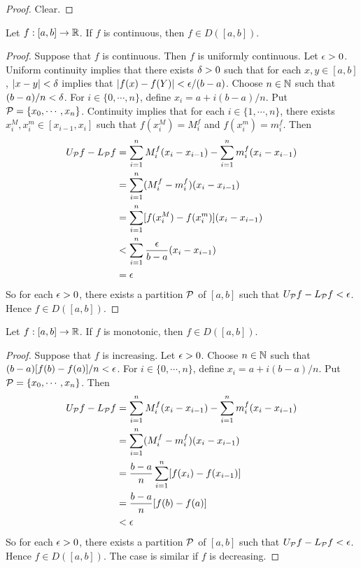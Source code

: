 \documentclass{book}
\begin{document}
	\begin{proof}
		Clear.
	\end{proof}

	\begin{ex}  
		Let $f:[a,b] \rightarrow \mathbb{R}$. If $f$ is continuous, then $f \in D([a,b])$. 
	\end{ex}

	\begin{proof}
		Suppose that $f$ is continuous. Then $f$ is uniformly continuous. Let $\epsilon >0$. Uniform continuity implies that there exists $\delta > 0$ such that for each $x, y \in [a,b]$, $|x-y| < \delta$ implies that $|f(x) - f(Y)| < \epsilon/(b-a)$. Choose $n \in \mathbb{N}$ such that $(b-a)/n < \delta$. For $i \in \{0, \cdots, n\}$, define $x_i = a + i(b-a)/n$. Put $\mathcal{P} = \{x_0, \cdots, x_n\}$. Continuity implies that for each $i \in \{1, \cdots, n\}$, there exists $x_i^M, x_i^m \in [x_{i-1}, x_i]$ such that $f(x_i^M) = M_i^f$ and $f(x_i^m) = m_i^f$. Then 
		\begin{align*}
			U_{\mathcal{P}} f - L_{\mathcal{P}} f 
			&= \sum_{i=1}^n M^f_i(x_i - x_{i-1}) - \sum_{i=1}^n m^f_i(x_i - x_{i-1}) \\
			&= \sum_{i=1}^n (M^f_i - m^f_i)(x_i - x_{i-1}) \\
			&= \sum_{i=1}^n [f(x_i^M) - f(x_i^m)](x_i - x_{i-1}) \\
			& < \sum_{i=1}^n \frac{\epsilon}{b-a}(x_i - x_{i-1}) \\
			&= \epsilon 
		\end{align*}
		So for each $\epsilon >0$, there exists a partition $\mathcal{P}$ of $[a,b]$ such that $U_{\mathcal{P}} f - L_{\mathcal{P}} f < \epsilon$. Hence $f \in D([a,b])$.
	\end{proof}

	\begin{ex}  
		Let $f:[a,b] \rightarrow \mathbb{R}$. If $f$ is monotonic, then $f \in D([a,b])$.
	\end{ex}

	\begin{proof}
		Suppose that $f$ is increasing. Let $\epsilon >0$. Choose $n \in \mathbb{N}$ such that $(b-a)[f(b) - f(a)] /n < \epsilon $. For $i \in \{0, \cdots, n\}$, define $x_i = a + i(b-a)/n$. Put $\mathcal{P} = \{x_0, \cdots, x_n\}$. Then 
		\begin{align*}
			U_{\mathcal{P}} f - L_{\mathcal{P}} f 
			&= \sum_{i=1}^n M^f_i(x_i - x_{i-1}) - \sum_{i=1}^n m^f_i(x_i - x_{i-1}) \\
			&= \sum_{i=1}^n (M^f_i - m^f_i)(x_i - x_{i-1}) \\
			&= \frac{b-a}{n} \sum_{i=1}^n [f(x_i) - f(x_{i-1})]  \\
			&= \frac{b-a}{n} [f(b) - f(a)] \\
			& < \epsilon
		\end{align*}
	So for each $\epsilon >0$, there exists a partition $\mathcal{P}$ of $[a,b]$ such that $U_{\mathcal{P}} f - L_{\mathcal{P}} f < \epsilon$. Hence $f \in D([a,b])$. The case is similar if $f$ is decreasing. 
	\end{proof}
\end{document}

